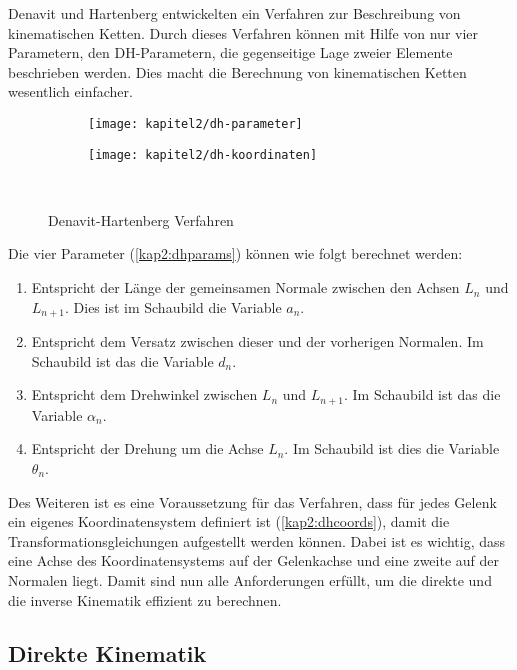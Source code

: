Denavit und Hartenberg entwickelten ein Verfahren zur Beschreibung von kinematischen Ketten. Durch dieses Verfahren können mit Hilfe von nur vier Parametern, den DH-Parametern, die gegenseitige Lage zweier Elemente beschrieben werden. Dies macht die Berechnung von kinematischen Ketten wesentlich einfacher.

\begin{figure}[b!]
  \centering
  \begin{subfigure}[b]{.4\linewidth}
    \centering
    \texttt{[image: kapitel2/dh-parameter]}
    \label{kap2:dhparams}
  \end{subfigure}%
  \qquad
  \begin{subfigure}[b]{.4\linewidth}
    \centering
    \texttt{[image: kapitel2/dh-koordinaten]}
    \label{kap2:dhcoords}
  \end{subfigure}\\
  \caption{Denavit-Hartenberg Verfahren}
  \label{kap2lauron}
\end{figure}

Die vier Parameter (\autoref{kap2:dhparams}) können wie folgt berechnet werden:
\begin{enumerate}
  \item Entspricht der Länge der gemeinsamen Normale zwischen den Achsen $L_n$ und $L_{n+1}$. Dies ist im Schaubild die Variable $a_n$.
  \item Entspricht dem Versatz zwischen dieser und der vorherigen Normalen. Im Schaubild ist das die Variable $d_n$.
  \item Entspricht dem Drehwinkel zwischen $L_n$ und $L_{n+1}$. Im Schaubild ist das die Variable $\alpha_n$.
  \item Entspricht der Drehung um die Achse $L_n$. Im Schaubild ist dies die Variable $\theta_n$.
\end{enumerate} 

Des Weiteren ist es eine Voraussetzung für das Verfahren, dass für jedes Gelenk ein eigenes Koordinatensystem definiert ist (\autoref{kap2:dhcoords}), damit die Transformationsgleichungen aufgestellt werden können. Dabei ist es wichtig, dass eine Achse des Koordinatensystems auf der Gelenkachse und eine zweite auf der Normalen liegt. Damit sind nun alle Anforderungen erfüllt, um die direkte und die inverse Kinematik effizient zu berechnen.

\subsection{Direkte Kinematik}

